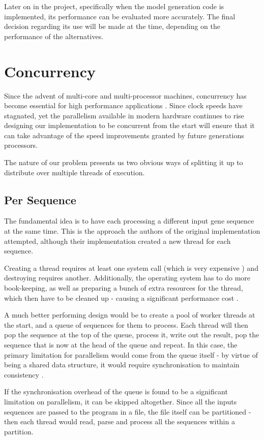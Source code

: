 Later on in the project, specifically when the model generation code is implemented, its performance can be evaluated more accurately. The final decision regarding its use will be made at the time, depending on the performance of the alternatives.

\section{Concurrency}
\label{sec:concurrency}
Since the advent of multi-core and multi-processor machines, concurrency has become essential for high performance applications \autocite{freelunch}. Since clock speeds have stagnated, yet the parallelism available in modern hardware continues to rise designing our implementation to be concurrent from the start will ensure that it can take advantage of the speed improvements granted by future generations processors.

The nature of our problem presents us two obvious ways of splitting it up to distribute over multiple threads of execution.

\subsection{Per Sequence}
 The fundamental idea is to have each processing a different input gene sequence at the same time. This is the approach the authors of the original implementation attempted, although their implementation created a new thread for each sequence.

 Creating a thread requires at least one system call (which is very expensive \autocite{syscalls}) and destroying requires another. Additionally, the operating system has to do more book-keeping, as well as preparing a bunch of extra resources for the thread, which then have to be cleaned up - causing a significant performance cost \autocite{threads}.

 A much better performing design would be to create a pool of worker threads at the start, and a queue of sequences for them to process. Each thread will then pop the sequence at the top of the queue, process it, write out the result, pop the sequence that is now at the head of the queue and repeat. In this case, the primary limitation for parallelism would come from the queue itself - by virtue of being a shared data structure, it would require synchronisation to maintain consistency \autocite{concurrency}.

 If the synchronisation overhead of the queue is found to be a significant limitation on parallelism, it can be skipped altogether. Since all the inputs sequences are passed to the program in a file, the file itself can be partitioned - then each thread would read, parse and process all the sequences within a partition.

